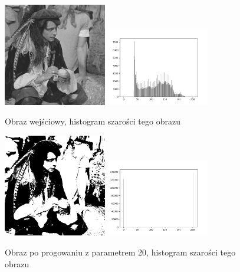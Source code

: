 \documentclass[final,a4paper,openany,12pt]{mwbk}
\begin{document}
\begin{figure}[H]
	\begin{center}
		\includegraphics[width=0.4\textwidth]{pirate_gray}
		\includegraphics[width=0.4\textwidth]{pirate_gray_histogram}
	\end{center}
	\caption{Obraz wejściowy, histogram szarości tego obrazu}
\end{figure}

\begin{figure}[H]
	\begin{center}
		\includegraphics[width=0.4\textwidth]{pirate_gray_globThreshold_result}
		\includegraphics[width=0.4\textwidth]{pirate_gray_globThreshold_histogram}
	\end{center}
	\caption{Obraz po progowaniu z parametrem 20, histogram szarości tego obrazu}
\end{figure}
\end{document}
